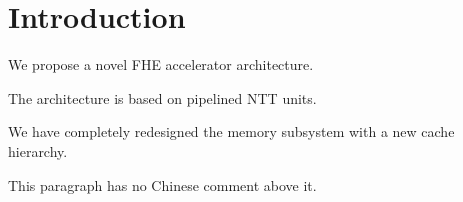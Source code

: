 \documentclass{article}
\begin{document}
\section{Introduction}

We propose a novel FHE accelerator architecture.

The architecture is based on pipelined NTT units.

We have completely redesigned the memory subsystem with a new cache hierarchy.

This paragraph has no Chinese comment above it.

\end{document}
